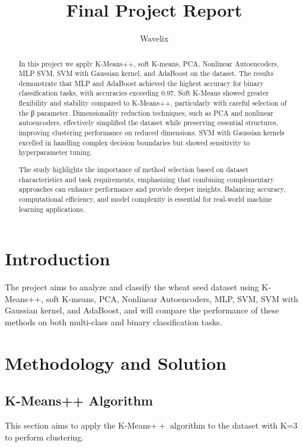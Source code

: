 \documentclass{article}
\title{\textbf{Final Project Report}}
\author{Wavelix}
\date{}
\begin{document}
\maketitle

\begin{abstract}
    In this project we apply K-Means++, soft K-means, PCA, Nonlinear Autoencoders, MLP SVM, SVM with Gaussian kernel, and AdaBoost on the dataset. The results demonstrate that MLP and AdaBoost achieved the highest accuracy for binary classification tasks, with accuracies exceeding 0.97. Soft K-Means showed greater flexibility and stability compared to K-Means++, particularly with careful selection of the β parameter. Dimensionality reduction techniques, such as PCA and nonlinear autoencoders, effectively simplified the dataset while preserving essential structures, improving clustering performance on reduced dimensions. SVM with Gaussian kernels excelled in handling complex decision boundaries but showed sensitivity to hyperparameter tuning.

    The study highlights the importance of method selection based on dataset characteristics and task requirements, emphasizing that combining complementary approaches can enhance performance and provide deeper insights. Balancing accuracy, computational efficiency, and model complexity is essential for real-world machine learning applications.
\end{abstract}

\tableofcontents %

\section{Introduction}
The project aims to analyze and classify the wheat seed dataset using K-Means++, soft K-means, PCA, Nonlinear Autoencoders, MLP, SVM, SVM with Gaussian kernel, and AdaBoost, and will compare the performance of these methods on both multi-class and binary classification tasks.

\section{Methodology and Solution}
\subsection{K-Means++ Algorithm}
This section aims to apply the K-Means$++$ algorithm to the dataset with K=3 to perform clustering.
\end{document}
